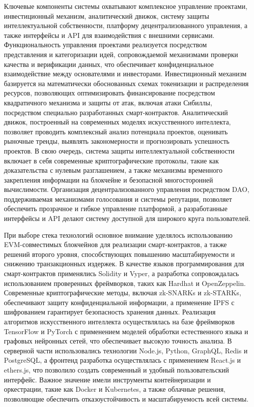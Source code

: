\documentclass[
    14pt,
    specialist,
    candidate, %
    subf, %
    href,
    times,
    dotsinheaders=false,
    colorlinks=false
]{disser}
\begin{document}
Ключевые компоненты системы охватывают комплексное управление проектами, инвестиционный механизм, аналитический движок, систему защиты интеллектуальной собственности, платформу децентрализованного управления, а также интерфейсы и API для взаимодействия с внешними сервисами. Функциональность управления проектами реализуется посредством представления и категоризации идей, сопровождаемой механизмами проверки качества и верификации данных, что обеспечивает конфиденциальное взаимодействие между основателями и инвесторами. Инвестиционный механизм базируется на математически обоснованных схемах токенизации и распределения ресурсов, позволяющих оптимизировать финансирование посредством квадратичного механизма и защиты от атак, включая атаки Сибиллы, посредством специально разработанных смарт-контрактов. Аналитический движок, построенный на современных моделях искусственного интеллекта, позволяет проводить комплексный анализ потенциала проектов, оценивать рыночные тренды, выявлять закономерности и прогнозировать успешность проектов. В свою очередь, система защиты интеллектуальной собственности включает в себя современные криптографические протоколы, такие как доказательства с нулевым разглашением, а также механизмы временного закрепления информации на блокчейне и безопасной многосторонней вычислимости. Организация децентрализованного управления посредством DAO, поддерживаемая механизмами голосования и системы репутации, позволяет обеспечить прозрачное и гибкое управление платформой, а разработанные интерфейсы и API делают систему доступной для широкого круга пользователей.

При выборе стека технологий основное внимание уделялось использованию EVM-совместимых блокчейнов для реализации смарт-контрактов, а также решений второго уровня, способствующих повышению масштабируемости и снижению транзакционных издержек. В качестве языков программирования для смарт-контрактов применялись Solidity и Vyper, а разработка сопровождалась использованием проверенных фреймворков, таких как Hardhat и OpenZeppelin. Современные криптографические методы, включая zk-SNARKs и zk-STARKs, обеспечивают защиту конфиденциальной информации, а применение IPFS с шифрованием гарантирует безопасность хранения данных. Реализация алгоритмов искусственного интеллекта осуществлялась на базе фреймворков TensorFlow и PyTorch с применением моделей обработки естественного языка и графовых нейронных сетей, что обеспечивает высокую точность анализа. В серверной части использовались технологии Node.js, Python, GraphQL, Redis и PostgreSQL, а фронтенд разработка осуществлялась с применением React.js и ethers.js, что позволило создать современный и удобный пользовательский интерфейс. Важное значение имели инструменты контейнеризации и оркестрации, такие как Docker и Kubernetes, а также облачные решения, позволяющие обеспечить отказоустойчивость и масштабируемость всей системы.
\end{document}
